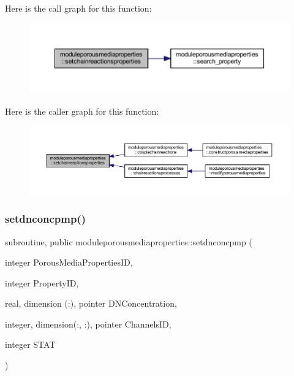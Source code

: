 Here is the call graph for this function\+:\nopagebreak
\begin{figure}[H]
\begin{center}
\leavevmode
\includegraphics[width=350pt]{namespacemoduleporousmediaproperties_a4eef1ed87ef643f7f98c8302286a6eb1_cgraph}
\end{center}
\end{figure}
Here is the caller graph for this function\+:\nopagebreak
\begin{figure}[H]
\begin{center}
\leavevmode
\includegraphics[width=350pt]{namespacemoduleporousmediaproperties_a4eef1ed87ef643f7f98c8302286a6eb1_icgraph}
\end{center}
\end{figure}
\mbox{\label{namespacemoduleporousmediaproperties_a06259226fc0457f3a2a483e2de48d783}} 
\subsubsection{\texorpdfstring{setdnconcpmp()}{setdnconcpmp()}}
{\footnotesize\ttfamily subroutine, public moduleporousmediaproperties\+::setdnconcpmp (\begin{DoxyParamCaption}\item[{integer}]{Porous\+Media\+Properties\+ID,  }\item[{integer}]{Property\+ID,  }\item[{real, dimension (\+:), pointer}]{D\+N\+Concentration,  }\item[{integer, dimension(\+:, \+:), pointer}]{Channels\+ID,  }\item[{integer}]{S\+T\+AT }\end{DoxyParamCaption})}

